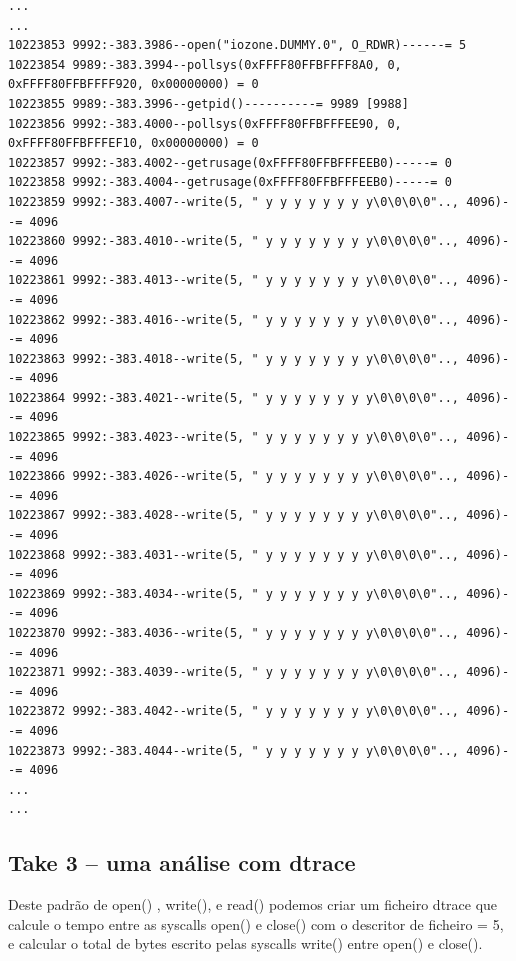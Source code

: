 \documentclass[a4paper]{article}
\begin{document}
{\begin{lstlisting}
...
...
10223853 9992:-383.3986--open("iozone.DUMMY.0", O_RDWR)------= 5
10223854 9989:-383.3994--pollsys(0xFFFF80FFBFFFF8A0, 0, 0xFFFF80FFBFFFF920, 0x00000000) = 0
10223855 9989:-383.3996--getpid()----------= 9989 [9988]
10223856 9992:-383.4000--pollsys(0xFFFF80FFBFFFEE90, 0, 0xFFFF80FFBFFFEF10, 0x00000000) = 0
10223857 9992:-383.4002--getrusage(0xFFFF80FFBFFFEEB0)-----= 0
10223858 9992:-383.4004--getrusage(0xFFFF80FFBFFFEEB0)-----= 0
10223859 9992:-383.4007--write(5, " y y y y y y y y\0\0\0\0".., 4096)--= 4096
10223860 9992:-383.4010--write(5, " y y y y y y y y\0\0\0\0".., 4096)--= 4096
10223861 9992:-383.4013--write(5, " y y y y y y y y\0\0\0\0".., 4096)--= 4096
10223862 9992:-383.4016--write(5, " y y y y y y y y\0\0\0\0".., 4096)--= 4096
10223863 9992:-383.4018--write(5, " y y y y y y y y\0\0\0\0".., 4096)--= 4096
10223864 9992:-383.4021--write(5, " y y y y y y y y\0\0\0\0".., 4096)--= 4096
10223865 9992:-383.4023--write(5, " y y y y y y y y\0\0\0\0".., 4096)--= 4096
10223866 9992:-383.4026--write(5, " y y y y y y y y\0\0\0\0".., 4096)--= 4096
10223867 9992:-383.4028--write(5, " y y y y y y y y\0\0\0\0".., 4096)--= 4096
10223868 9992:-383.4031--write(5, " y y y y y y y y\0\0\0\0".., 4096)--= 4096
10223869 9992:-383.4034--write(5, " y y y y y y y y\0\0\0\0".., 4096)--= 4096
10223870 9992:-383.4036--write(5, " y y y y y y y y\0\0\0\0".., 4096)--= 4096
10223871 9992:-383.4039--write(5, " y y y y y y y y\0\0\0\0".., 4096)--= 4096
10223872 9992:-383.4042--write(5, " y y y y y y y y\0\0\0\0".., 4096)--= 4096
10223873 9992:-383.4044--write(5, " y y y y y y y y\0\0\0\0".., 4096)--= 4096
...
...
\end{lstlisting}

\subsection{Take 3 -- uma análise com dtrace}

Deste padrão de open() , write(), e read() podemos criar um ficheiro dtrace que calcule o tempo entre as syscalls open() e close() com o descritor de ficheiro = 5, e calcular o total de bytes escrito pelas syscalls write() entre open() e close().

\newpage
}
\end{document}
